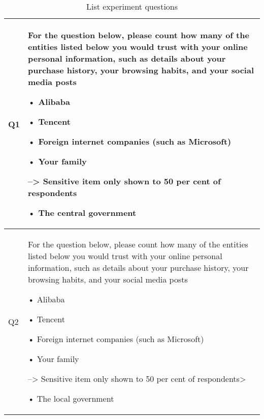 \documentclass[
  letterpaper,
  DIV=11,
  numbers=noendperiod]{scrartcl}
\begin{document}
\hypertarget{tbl-listexp.q.text}{}
\begin{table}
\caption{\label{tbl-listexp.q.text}List experiment questions }\tabularnewline

\centering
\begin{tabular}{l|>{\raggedright\arraybackslash}p{5in}}
\hline
Q1 & For the question below, please count how many of the entities listed below you would trust with your online personal information, such as details about your purchase history, your browsing habits, and your social media posts

• Alibaba

• Tencent

• Foreign internet companies (such as Microsoft)

• Your family

--> Sensitive item only shown to 50 per cent of respondents

• The central government\\
\hline
Q2 & For the question below, please count how many of the entities listed below you would trust with your online personal information, such as details about your purchase history, your browsing habits, and your social media posts

•   Alibaba

•   Tencent

•   Foreign internet companies (such as Microsoft)

•   Your family

--> Sensitive item only shown to 50 per cent of respondents>

•   The local government\\
\hline
\end{tabular}
\end{table}
\end{document}
